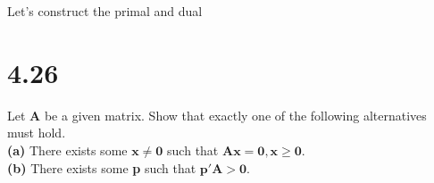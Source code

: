 \documentclass{article}
\begin{document}
Let's construct the primal and dual 

\section*{4.26} 
Let $\mathbf{A}$ be a given matrix.  Show that exactly one of the following alternatives must hold.\\
\textbf{(a)} There exists some $\mathbf{x \neq 0}$ such that $\mathbf{Ax = 0, x \geq 0}$.\\
\textbf{(b)} There exists some \textbf{p} such that $\mathbf{p'A > 0}$. \\
\end{document}
